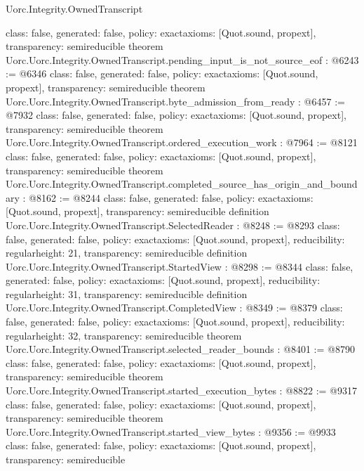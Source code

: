 \begin{lexlean}{Uorc.Integrity.OwnedTranscript}
\begin{coremodule}
{  class: false,
  generated: false,
  policy: exact{axioms: [Quot.sound, propext]},
  transparency: semireducible
}
theorem Uorc.Uorc.Integrity.OwnedTranscript.pending_input_is_not_source_eof : @6243 := @6346 {
  class: false,
  generated: false,
  policy: exact{axioms: [Quot.sound, propext]},
  transparency: semireducible
}
theorem Uorc.Uorc.Integrity.OwnedTranscript.byte_admission_from_ready : @6457 := @7932 {
  class: false,
  generated: false,
  policy: exact{axioms: [Quot.sound, propext]},
  transparency: semireducible
}
theorem Uorc.Uorc.Integrity.OwnedTranscript.ordered_execution_work : @7964 := @8121 {
  class: false,
  generated: false,
  policy: exact{axioms: [Quot.sound, propext]},
  transparency: semireducible
}
theorem Uorc.Uorc.Integrity.OwnedTranscript.completed_source_has_origin_and_boundary : @8162 := @8244 {
  class: false,
  generated: false,
  policy: exact{axioms: [Quot.sound, propext]},
  transparency: semireducible
}
definition Uorc.Uorc.Integrity.OwnedTranscript.SelectedReader : @8248 := @8293 {
  class: false,
  generated: false,
  policy: exact{axioms: [Quot.sound, propext]},
  reducibility: regular{height: 21},
  transparency: semireducible
}
definition Uorc.Uorc.Integrity.OwnedTranscript.StartedView : @8298 := @8344 {
  class: false,
  generated: false,
  policy: exact{axioms: [Quot.sound, propext]},
  reducibility: regular{height: 31},
  transparency: semireducible
}
definition Uorc.Uorc.Integrity.OwnedTranscript.CompletedView : @8349 := @8379 {
  class: false,
  generated: false,
  policy: exact{axioms: [Quot.sound, propext]},
  reducibility: regular{height: 32},
  transparency: semireducible
}
theorem Uorc.Uorc.Integrity.OwnedTranscript.selected_reader_bounds : @8401 := @8790 {
  class: false,
  generated: false,
  policy: exact{axioms: [Quot.sound, propext]},
  transparency: semireducible
}
theorem Uorc.Uorc.Integrity.OwnedTranscript.started_execution_bytes : @8822 := @9317 {
  class: false,
  generated: false,
  policy: exact{axioms: [Quot.sound, propext]},
  transparency: semireducible
}
theorem Uorc.Uorc.Integrity.OwnedTranscript.started_view_bytes : @9356 := @9933 {
  class: false,
  generated: false,
  policy: exact{axioms: [Quot.sound, propext]},
  transparency: semireducible
}


\end{coremodule}
\end{lexlean}
